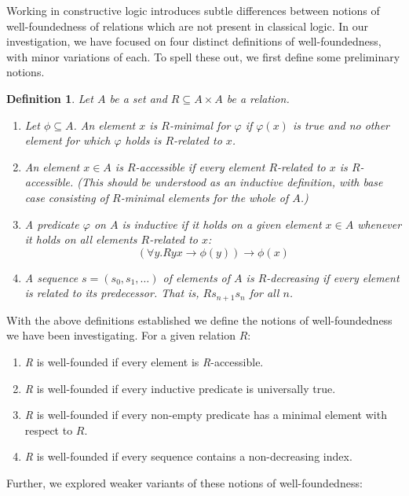 \documentclass{scrartcl}
\newcommand{\sse}{\subseteq}
\newtheorem{dfn}[thm]{Definition}
\begin{document}
Working in constructive logic introduces subtle differences between notions of well-foundedness of relations
which are not present in classical logic.  In our investigation, we have focused on four distinct definitions of well-foundedness, with minor variations of each. To spell these out, we first define some preliminary notions.

\begin{dfn} Let $A$ be a set and $R \sse A \times A$ be a relation.
\begin{enumerate}
  \item Let $\phi \sse A$.  An element $x$ is $R$-minimal for $\varphi$ if $\varphi(x)$ is true and no other element for which $\varphi$ holds is $R$-related to $x$.
  \item An element $x \in A$ is \textit{$R$-accessible} if every element $R$-related to $x$ is \textit{$R$-accessible}.  (This should be understood as an inductive definition, with base case consisting of $R$-minimal elements for the whole of $A$.)
    \item A predicate $\varphi$ on $A$ is \emph{inductive} if it holds on a given element $x \in A$ whenever it holds on all elements $R$-related to $x$:
    \[ (\forall y. Ryx \to \phi(y)) \to \phi(x) \]
    \item A sequence $s = (s_0,s_1,\dots)$ of elements of $A$ is $R$-decreasing
    if every element is related to its predecessor.  That is, $Rs_{n+1}s_n$ for all $n$.
\end{enumerate}
\end{dfn}
With the above definitions established we define the notions of well-foundedness we have been investigating. For a given relation $R$:
\begin{enumerate}
    \item \textit{R} is well-founded if every element is \textit{R}-accessible.
    \item \textit{R} is well-founded if every inductive predicate is universally true.
    \item \textit{R} is well-founded if every non-empty predicate has a minimal element with respect to $R$.
    \item \textit{R} is well-founded if every sequence contains a non-decreasing index.
\end{enumerate}
Further, we explored weaker variants of these notions of well-foundedness:
\end{document}
